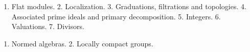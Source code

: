 


\begin{enumerate}
\def\labelenumi{\arabic{enumi}.}
\tightlist
\item
  Flat modules. 2. Localization. 3. Graduations, filtrations and topologies. 4. Associated prime ideals and primary decomposition. 5. Integers. 6. Valuations. 7. Divisors.
\end{enumerate}


\begin{enumerate}
\def\labelenumi{\arabic{enumi}.}
\tightlist
\item
  Normed algebras. 2. Locally compact groups.
\end{enumerate}

